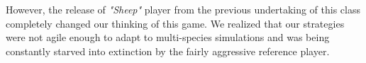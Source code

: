 However, the release of {\em "Sheep"} player from the previous 
undertaking of this class completely changed our thinking of this game. 
We realized that our strategies were not agile enough to adapt to 
multi-species simulations and was being constantly starved into extinction 
by the fairly aggressive reference player. 

